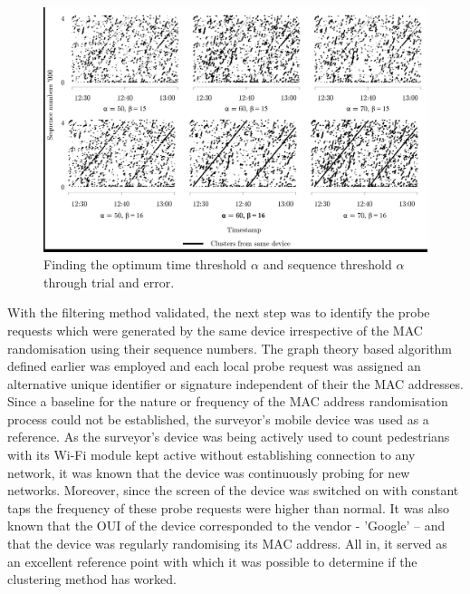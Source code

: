 \begin{figure}
  \includegraphics[trim={1 1 1 1},clip]{images/processing-oxst-clusters.jpg}
  \caption{Finding the optimum time threshold $\alpha$ and sequence threshold $\alpha$ through trial and error.}
  \label{figure:processing:oxst:clusters}
\end{figure}

With the filtering method validated, the next step was to identify the probe requests which were generated by the same device irrespective of the MAC randomisation using their sequence numbers.
The graph theory based algorithm defined earlier was employed and each local probe request was assigned an alternative unique identifier or signature independent of their the MAC addresses.
Since a baseline for the nature or frequency of the MAC address randomisation process could not be established, the surveyor’s mobile device was used as a reference.
As the surveyor’s device was being actively used to count pedestrians with its Wi-Fi module kept active without establishing connection to any network, it was known that the device was continuously probing for new networks.
Moreover, since the screen of the device was switched on with constant taps the frequency of these probe requests were higher than normal.
It was also known that the OUI of the device corresponded to the vendor - ’Google’ – and that the device was regularly randomising its MAC address.
All in, it served as an excellent reference point with which it was possible to determine if the clustering method has worked.

